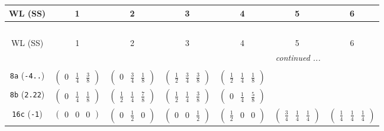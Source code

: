 \documentclass[fleqn,9pt,landscape]{jsarticle}
\begin{document}
\begin{center}
\renewcommand{\arraystretch}{1.2}
\begin{longtable}{ccccccc}
 \hline \hline
WL (SS) & 1 & 2 & 3 & 4 & 5 & 6 \\ \hline \endfirsthead

\multicolumn{6}{l}{\tablename\ \thetable{}} \\
 \hline \hline
WL (SS) & 1 & 2 & 3 & 4 & 5 & 6 \\ \hline \endhead

 \hline \hline
\multicolumn{6}{r}{\footnotesize\it continued ...} \\ \endfoot

 \hline \hline
\multicolumn{6}{r}{} \\ \endlastfoot

{\tt 8a} ({\tt -4..}) & $ \begin{pmatrix} 0 & \frac{1}{4} & \frac{3}{8} \end{pmatrix} $ & $ \begin{pmatrix} 0 & \frac{3}{4} & \frac{1}{8} \end{pmatrix} $ & $ \begin{pmatrix} \frac{1}{2} & \frac{3}{4} & \frac{3}{8} \end{pmatrix} $ & $ \begin{pmatrix} \frac{1}{2} & \frac{1}{4} & \frac{1}{8} \end{pmatrix} $ & $  $ & $  $ \\ \hline
{\tt 8b} ({\tt 2.22}) & $ \begin{pmatrix} 0 & \frac{1}{4} & \frac{1}{8} \end{pmatrix} $ & $ \begin{pmatrix} \frac{1}{2} & \frac{1}{4} & \frac{7}{8} \end{pmatrix} $ & $ \begin{pmatrix} \frac{1}{2} & \frac{1}{4} & \frac{3}{8} \end{pmatrix} $ & $ \begin{pmatrix} 0 & \frac{1}{4} & \frac{5}{8} \end{pmatrix} $ & $  $ & $  $ \\ \hline
{\tt 16c} ({\tt -1}) & $ \begin{pmatrix} 0 & 0 & 0 \end{pmatrix} $ & $ \begin{pmatrix} 0 & \frac{1}{2} & 0 \end{pmatrix} $ & $ \begin{pmatrix} 0 & 0 & \frac{1}{2} \end{pmatrix} $ & $ \begin{pmatrix} \frac{1}{2} & 0 & 0 \end{pmatrix} $ & $ \begin{pmatrix} \frac{3}{4} & \frac{1}{4} & \frac{1}{4} \end{pmatrix} $ & $ \begin{pmatrix} \frac{1}{4} & \frac{1}{4} & \frac{1}{4} \end{pmatrix} $ \\

\end{longtable}
\end{center}
\end{document}

